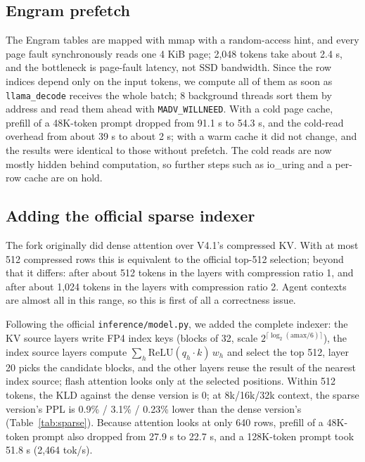 \documentclass[11pt,a4paper]{article}
\newcommand{\code}[1]{\texttt{#1}}
\newcommand{\tps}{tok/s}
\begin{document}
\subsection{Engram prefetch}

The Engram tables are mapped with mmap with a random-access hint, and every page fault synchronously reads one 4 KiB page; 2,048 tokens take about 2.4 s, and the bottleneck is page-fault latency, not SSD bandwidth. Since the row indices depend only on the input tokens, we compute all of them as soon as \code{llama\_decode} receives the whole batch; 8 background threads sort them by address and read them ahead with \code{MADV\_WILLNEED}. With a cold page cache, prefill of a 48K-token prompt dropped from 91.1 s to 54.3 s, and the cold-read overhead from about 39 s to about 2 s; with a warm cache it did not change, and the results were identical to those without prefetch. The cold reads are now mostly hidden behind computation, so further steps such as io\_uring and a per-row cache are on hold.

\subsection{Adding the official sparse indexer}
\label{sec:indexer}

The fork originally did dense attention over V4.1's compressed KV. With at most 512 compressed rows this is equivalent to the official top-512 selection; beyond that it differs: after about 512 tokens in the layers with compression ratio 1, and after about 1,024 tokens in the layers with compression ratio 2. Agent contexts are almost all in this range, so this is first of all a correctness issue.

Following the official \code{inference/model.py}, we added the complete indexer: the KV source layers write FP4 index keys (blocks of 32, scale $2^{\lceil \log_2(\mathrm{amax}/6) \rceil}$), the index source layers compute $\sum_h \mathrm{ReLU}(q_h \cdot k)\, w_h$ and select the top 512, layer 20 picks the candidate blocks, and the other layers reuse the result of the nearest index source; flash attention looks only at the selected positions. Within 512 tokens, the KLD against the dense version is 0; at 8k/16k/32k context, the sparse version's PPL is 0.9\% / 3.1\% / 0.23\% lower than the dense version's (Table~\ref{tab:sparse}). Because attention looks at only 640 rows, prefill of a 48K-token prompt also dropped from 27.9 s to 22.7 s, and a 128K-token prompt took 51.8 s (2,464 \tps{}).
\end{document}
